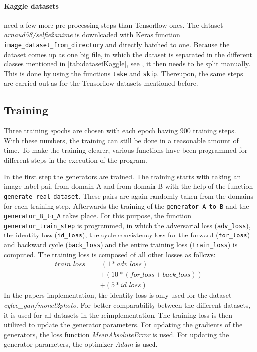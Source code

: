 \documentclass[fleqn,10pt]{SelfArx} %
\begin{document}
\paragraph{Kaggle datasets} need a few more pre-processing steps than Tensorflow ones. The dataset \textit{arnaud58/selfie2anime} is downloaded with Keras function \texttt{image\_dataset\_from\-\_di\-rec\-tory} and directly batched to one. Because the dataset comes up as one big file, in which the dataset is separated in the different classes mentioned in \autoref{tab:datasetKaggle}, see \cite{kaggle-dataset}, it then needs to be split manually. This is done by using the functions \texttt{take} and \texttt{skip}. Thereupon, the same steps are carried out as for the Tensorflow datasets mentioned before.

\subsection{Training}
Three training epochs are chosen with each epoch having 900 training steps. With these numbers, the training can still be done in a reasonable amount of time. To make the training clearer, various functions have been programmed for different steps in the execution of the program.
 
In the first step the generators are trained. The training starts with taking an image-label pair from domain A and from domain B with the help of the function \texttt{generate\-\_real\-\_dataset}. These pairs are again randomly taken from the domains for each training step. Afterwards the training of the \texttt{generator\-\_A\-\_to\-\_B} and the \texttt{generator\-\_B\-\_to\-\_A} takes place. For this purpose, the function \texttt{generator\-\_train\-\_step} is programmed, in which the adversarial loss (\texttt{adv\-\_loss}), the identity loss (\texttt{id\-\_loss}), the cycle consistency loss for the forward (\texttt{for\_loss}) and backward cycle (\texttt{back\_loss}) and the entire training loss (\texttt{train\_loss}) is computed. The training loss is composed of all other losses as follows:
\begin{equation*}
\begin{split}
train\_loss = &~(1 * adv\_loss) \\
&+ (10 * (for\_loss + back\_loss)) \\
&+ (5 * id\_loss)
\end{split}
\end{equation*}
In the papers implementation, the identity loss is only used for the dataset \textit{cylce\_gan/monet2photo}. For better comparability between the different datasets, it is used for all datasets in the reimplementation. The training loss is then utilized to update the generator parameters. For updating the gradients of the generators, the loss function \textit{MeanAbsoluteError} is used. For updating the generator parameters, the optimizer \textit{Adam} is used.~\cite{image-to-image-ccan, google-Adam, google-GradientTape}
\end{document}

